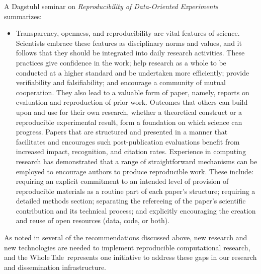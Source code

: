 \documentclass{elsarticle}
\newcommand{\wt}{Whole\,Tale}
\begin{document}
\noindent A Dagstuhl seminar on \emph{Reproducibility of Data-Oriented Experiments} \cite {freire2016reproducibility} summarizes:
\begin{itemize}
\item
Transparency, openness, and reproducibility are vital features of science. Scientists embrace these features as disciplinary norms and values, and it follows that they should be integrated into daily research activities. These practices give confidence in the work; help research as a whole to be conducted at a higher standard and be undertaken more efficiently; provide verifiability and falsifiability; and encourage a community of mutual cooperation. They also lead to a valuable form of paper, namely, reports on evaluation and reproduction of prior work. Outcomes that others can build upon and use for their own research, whether a theoretical construct or a reproducible experimental result, form a foundation on which science can progress. Papers that are structured and presented in a manner that facilitates and encourages such post-publication evaluations benefit from increased impact, recognition, and citation rates.
Experience in computing research has demonstrated that a range of straightforward mechanisms can be employed to encourage authors to produce reproducible work. These include: requiring an explicit commitment to an intended level of provision of reproducible materials as a routine part of each paper's structure; requiring a detailed methods section; separating the refereeing of the paper's scientific contribution and its technical process; and explicitly encouraging the creation and reuse of open resources (data, code, or both).
\end{itemize}

As noted in several of the recommendations discussed above, new research and new technologies are needed to implement reproducible computational research, and the \wt\ represents one initiative to address these gaps in our research and dissemination infrastructure. 

\end{document}
